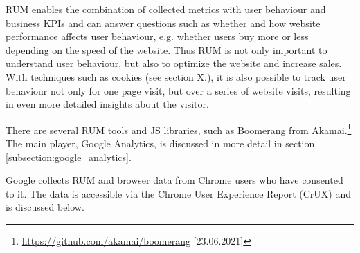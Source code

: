 RUM enables the combination of collected metrics with user behaviour and business KPIs and can answer questions such as whether and how website performance affects user behaviour, e.g. whether users buy more or less depending on the speed of the website. %
Thus RUM is not only important to understand user behaviour, but also to optimize the website and increase sales.
With techniques such as cookies (see section X.), it is also possible to track user behaviour not only for one page visit, but over a series of website visits, resulting in even more detailed insights about the visitor. %


There are several RUM tools and JS libraries, such as Boomerang from Akamai.\footnote{\url{https://github.com/akamai/boomerang} [23.06.2021]}
The main player, Google Analytics, is discussed in more detail in section \ref{subsection:google_analytics}.



Google collects RUM and browser data from Chrome users who have consented to it.
The data is accessible via the Chrome User Experience Report (CrUX) and is discussed below.








